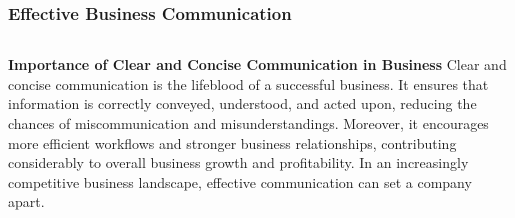 \documentclass[5pt]{beamer}
\begin{document}
\begin{frame}
\frametitle{Effective Business Communication}
\begin{columns}
\begin{column}{0.7\textwidth}
\begin{block}{\textbf{Importance of Clear and Concise Communication in Business}}
Clear and concise communication is the lifeblood of a successful business. It ensures that information is correctly conveyed, understood, and acted upon, reducing the chances of miscommunication and misunderstandings. Moreover, it encourages more efficient workflows and stronger business relationships, contributing considerably to overall business growth and profitability. In an increasingly competitive business landscape, effective communication can set a company apart.
\end{block}
\end{column}
\end{columns}
\end{frame}
\end{document}
